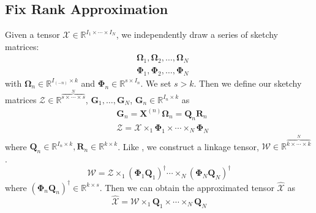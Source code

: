 \subsection{Fix Rank Approximation}
Given a tensor $\mathscr{X} \in \mathbb{R}^{I_1 \times \cdots \times I_N} $, we independently draw a series of sketchy matrices:
\begin{equation}
\begin{aligned}
&\mathbf{\Omega}_1, \mathbf{\Omega}_2, \dots, \mathbf{\Omega}_N\\
&\mathbf{\Phi}_1, \mathbf{\Phi}_2, \dots, \mathbf{\Phi}_N
\end{aligned}
\end{equation}
with $\mathbf{\Omega}_n \in \mathbb{R}^{I_{(-n)} \times k}$ and $\mathbf{\Phi}_n \in \mathbb{R}^{s\times I_n}$. We set $s>k$. Then we define our sketchy matrices $\mathscr{Z} \in \mathbb{R}^{ \overbrace{s \times \cdots \times s}^{N}} $, $\mathbf{G}_1, \dots, \mathbf{G}_N$, $\mathbf{G}_n \in \mathbb{R}^{I_n \times k}$ as 
\begin{equation}
\label{eq:sketchy_matrix}
\begin{aligned}
&\mathbf{G}_n = \mathbf{X}^{(n)}\mathbf{\Omega}_n   = \mathbf{Q}_n\mathbf{R}_n\\
&\mathscr{Z} = \mathscr{X} \times_1 \mathbf{\Phi}_1 \times \cdots \times_N \mathbf{\Phi}_N  
\end{aligned}
\end{equation}
where $\mathbf{Q}_n \in \mathbb{R}^{I_n \times k}, \mathbf{R}_n \in \mathbb{R}^{k\times k} $. Like \cite{tropp2016randomized}, we construct a linkage tensor, $\mathscr{W} \in \mathbb{R}^{\overbrace{k \times \cdots \times k }^{N}}$. 
\begin{equation}
\mathscr{W} = \mathscr{Z}\times_1 (\mathbf{\Phi}_1\mathbf{Q}_1)^\dag \cdots \times_N (\mathbf{\Phi}_N\mathbf{Q}_N)^\dag
\end{equation}
where $(\mathbf{\Phi}_n \mathbf{Q}_n)^\dag \in \mathbb{R}^{k \times s} $. Then we can obtain the approximated tensor $\hat{\mathscr{X}}$ as
\begin{equation}
\hat{\mathscr{X}} = \mathscr{W} \times_1 \mathbf{Q}_1 \times \cdots \times_N \mathbf{Q}_N
\end{equation}

